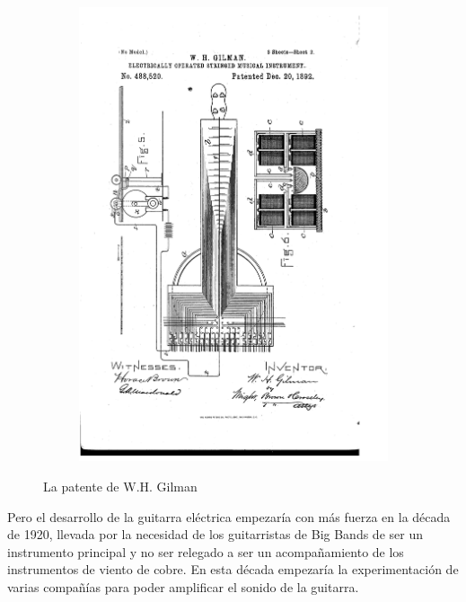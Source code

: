 \documentclass{article}
\begin{document}
\begin{figure}[h]
\begin{center}
\begin{subfigure}{0.3\textwidth}
        \end{subfigure}
        \begin{subfigure}{0.3\textwidth}
            \includegraphics[scale=0.18]{images/patente2.png}
        \end{subfigure}
    \end{center}
    \vspace{-5pt}
    \caption{La patente de W.H. Gilman}
\end{figure}

Pero el desarrollo de la guitarra eléctrica empezaría con más fuerza en la década de 1920, llevada por la necesidad de los guitarristas de Big Bands de ser un instrumento principal y no ser relegado a ser un acompañamiento de los instrumentos de viento de cobre. En esta década empezaría la experimentación de varias compañías para poder amplificar el sonido de la guitarra. \\
\end{document}
